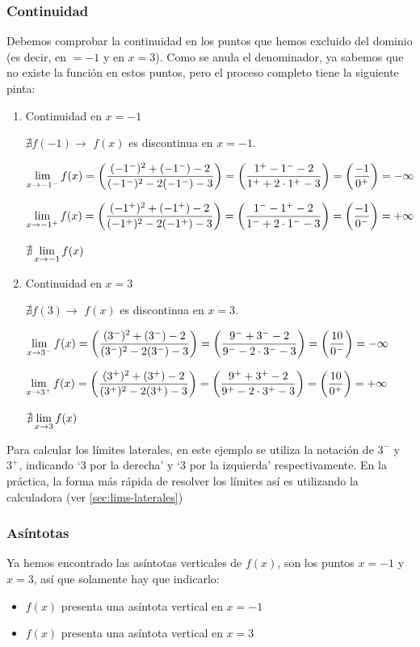 \documentclass[sans]{apuntes}
\begin{document}
\begin{examplebox}
	\subsubsection*{Continuidad}
	Debemos comprobar la continuidad en los puntos que hemos excluido del dominio (es decir, en $= -1$ y en $x = 3$). Como se anula el denominador, ya sabemos que no existe la función en estos puntos, pero el proceso completo tiene la siguiente pinta:
	\begin{enumerate}
		\item Continuidad en $x = -1$
			\par \(\nexists f(-1) \to \) $f(x)$ es discontinua en $x = -1$.
			\par \(\displaystyle\lim_{x \to -1^-} f(x) = \left(\frac{(-1^-)^2 + (-1^-) -2}{(-1^-)^2 - 2(-1^-) - 3}\right) = \left(\frac{1^+ - 1^- - 2}{1^+ + 2\cdot1^+ -3}\right) = \left(\frac{-1}{0^+}\right) = -\infty\)
			\par \(\displaystyle\lim_{x \to -1^+} f(x) = \left(\frac{(-1^+)^2 + (-1^+) -2}{(-1^+)^2 - 2(-1^+) - 3}\right) = \left(\frac{1^- - 1^+ - 2}{1^- + 2\cdot1^- -3}\right) = \left(\frac{-1}{0^-}\right) = +\infty\)
			\par \(\nexists \displaystyle\lim_{x \to -1} f(x)\)
		\item Continuidad en $x = 3$
			\par \(\nexists f(3) \to \) $f(x)$ es discontinua en $x = 3$.
			\par \(\displaystyle\lim_{x \to 3^-} f(x) = \left(\frac{(3^-)^2 + (3^-) -2}{(3^-)^2 - 2(3^-) - 3}\right) = \left(\frac{9^- + 3^- - 2}{9^- - 2\cdot3^- -3}\right) = \left(\frac{10}{0^-}\right) = -\infty\)
			\par \(\displaystyle\lim_{x \to 3^+} f(x) = \left(\frac{(3^+)^2 + (3^+) -2}{(3^+)^2 - 2(3^+) - 3}\right) = \left(\frac{9^+ + 3^+ - 2}{9^+ - 2\cdot3^+ -3}\right) = \left(\frac{10}{0^+}\right) = +\infty\)
			\par \(\nexists \displaystyle\lim_{x \to 3} f(x)\)
	\end{enumerate}

	Para calcular los límites laterales, en este ejemplo se utiliza la notación de $3^-$ y $3^+$, indicando `3 por la derecha' y `3 por la izquierda' respectivamente. En la práctica, la forma más rápida de resolver los límites así es utilizando la calculadora (ver \autoref{sec:lims-laterales})

	\subsubsection*{Asíntotas}
	Ya hemos encontrado las asíntotas verticales de $f(x)$, son los puntos $x = -1$ y $x = 3$, así que solamente hay que indicarlo:
	\begin{itemize}
		\item $f(x)$ presenta una asíntota vertical en $x = -1$
		\item $f(x)$ presenta una asíntota vertical en $x = 3$
	\end{itemize}


\end{examplebox}
\end{document}
